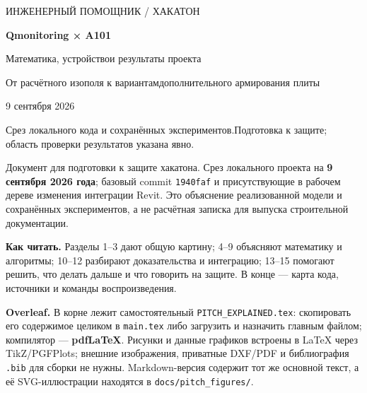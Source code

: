\documentclass[11pt,a4paper]{article}
\begin{document}
\begin{titlepage}
\color{Ink}
{\sffamily\large ИНЖЕНЕРНЫЙ ПОМОЩНИК / ХАКАТОН\par}
\vspace{2cm}
{\sffamily\fontsize{32}{38}\selectfont\bfseries Qmonitoring × A101\par}
\vspace{0.7cm}
{\sffamily\fontsize{24}{31}\selectfont Математика, устройство\newline и результаты проекта\par}
\vspace{1cm}
{\large От расчётного изополя к вариантам\newline дополнительного армирования плиты\par}
\vspace{1.5cm}
\vfill
{\sffamily\large 9 сентября 2026\par}
\smallskip
{\small Срез локального кода и сохранённых экспериментов.\newline Подготовка к защите; область проверки результатов указана явно.\par}
\end{titlepage}
\tableofcontents
\clearpage


Документ для подготовки к защите хакатона. Срез локального проекта на \textbf{9 сентября 2026 года}; базовый commit {\small\nolinkurl{1940faf}} и присутствующие в рабочем дереве изменения интеграции Revit. Это объяснение реализованной модели и сохранённых экспериментов, а не расчётная записка для выпуска строительной документации.


\textbf{Как читать.} Разделы 1–3 дают общую картину; 4–9 объясняют математику и алгоритмы; 10–12 разбирают доказательства и интеграцию; 13–15 помогают решить, что делать дальше и что говорить на защите. В конце — карта кода, источники и команды воспроизведения.


\textbf{Overleaf.} В корне лежит самостоятельный {\small\nolinkurl{PITCH_EXPLAINED.tex}}: скопировать его содержимое целиком в {\small\nolinkurl{main.tex}} либо загрузить и назначить главным файлом; компилятор — \textbf{pdfLaTeX}. Рисунки и данные графиков встроены в LaTeX через TikZ/PGFPlots; внешние изображения, приватные DXF/PDF и библиография {\small\nolinkurl{.bib}} для сборки не нужны. Markdown-версия содержит тот же основной текст, а её SVG-иллюстрации находятся в {\small\nolinkurl{docs/pitch_figures/}}.
\end{document}
